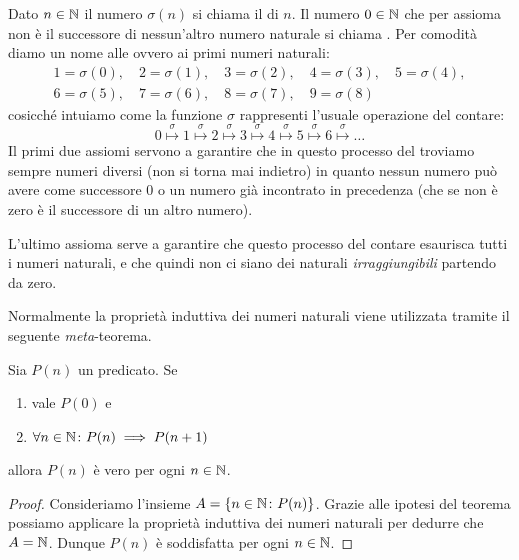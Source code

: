 Dato $n\in {\mathbb N}$ il numero $\sigma(n)$ si chiama il  di $n$.
Il numero $0\in {\mathbb N}$ che per assioma non è il successore di nessun'altro 
numero naturale si chiama . 
Per comodità diamo un nome alle  
ovvero ai primi numeri naturali:
\begin{equation}\label{eq:cifre}
\begin{gathered}
 1 = \sigma(0),\quad  
 2 = \sigma(1),\quad
 3 = \sigma(2),\quad 
 4 = \sigma(3),\quad
 5 = \sigma(4),\\ 
 6 = \sigma(5),\quad 
 7 = \sigma(6),\quad 
 8 = \sigma(7),\quad 
 9 = \sigma(8)
\end{gathered}
\end{equation}
 cosicché intuiamo come la funzione $\sigma$ rappresenti 
 l'usuale operazione del contare:
 \[
 0 \stackrel\sigma\mapsto 1 \stackrel\sigma\mapsto 2 \stackrel\sigma\mapsto 
 3 \stackrel\sigma\mapsto 4 \stackrel\sigma\mapsto 5 \stackrel\sigma\mapsto 
 6 \stackrel\sigma\mapsto \dots  
 \]
Il primi due assiomi servono a garantire che in questo processo del 
troviamo sempre numeri diversi (non si torna mai indietro) in quanto nessun numero 
può avere come successore $0$ o un numero già incontrato in precedenza (che 
se non è zero è il successore di un altro numero).

L'ultimo assioma serve a garantire che questo processo del contare esaurisca tutti 
i numeri naturali, e che quindi non ci siano dei naturali \emph{irraggiungibili}
partendo da zero.

Normalmente la proprietà induttiva dei numeri naturali viene utilizzata tramite 
il seguente \emph{meta}-teorema.

\begin{theorem}
  Sia $P(n)$ un predicato.
  Se 
  \begin{enumerate}
    \item vale $P(0)$ e 
    \item $\forall n\in {\mathbb N}\colon P(n)\implies P(n+1)$
  \end{enumerate} 
  allora $P(n)$ è vero per ogni $n\in {\mathbb N}$.
\end{theorem}
%
\begin{proof}
  Consideriamo l'insieme $A=\{n\in {\mathbb N}\colon P(n)\}$.
  Grazie alle ipotesi del teorema possiamo applicare la proprietà 
  induttiva dei numeri naturali per dedurre che $A={\mathbb N}$.
  Dunque $P(n)$ è soddisfatta per ogni $n\in{\mathbb N}$.
\end{proof}

